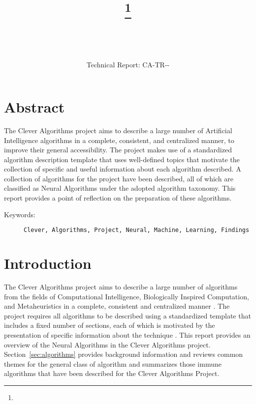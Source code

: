 \documentclass[a4paper, 11pt]{article}
\title{{\myreporttitle}\footnote{\myreportlicense}}
\author{\myreportauthor\\{\myreportemail}\\\small\myreportproject}
\date{\myreportfulldate\\{\small{Technical Report: CA-TR-{\myreportdate}-\myreportversion}}}
\begin{document}
\maketitle

\section*{Abstract} 
The Clever Algorithms project aims to describe a large number of Artificial Intelligence algorithms in a complete, consistent, and centralized manner, to improve their general accessibility. 
The project makes use of a standardized algorithm description template that uses well-defined topics that motivate the collection of specific and useful information about each algorithm described.
A collection of algorithms for the project have been described, all of which are classified as Neural Algorithms under the adopted algorithm taxonomy.
This report provides a point of reflection on the preparation of these algorithms.

\begin{description}
	\item[Keywords:] {\small\texttt{Clever, Algorithms, Project, Neural, Machine, Learning, Findings}}
\end{description} 

\section{Introduction}
\label{sec:introduction}
The Clever Algorithms project aims to describe a large number of algorithms from the fields of Computational Intelligence, Biologically Inspired Computation, and Metaheuristics in a complete, consistent and centralized manner \cite{Brownlee2010}.
The project requires all algorithms to be described using a standardized template that includes a fixed number of sections, each of which is motivated by the presentation of specific information about the technique \cite{Brownlee2010a}.
This report provides an overview of the Neural Algorithms in the Clever Algorithms project. 
Section~\ref{sec:algorithms} provides background information and reviews common themes for the general class of algorithm and summarizes those immune algorithms that have been described for the Clever Algorithms Project.

% 
% 
\end{document}
